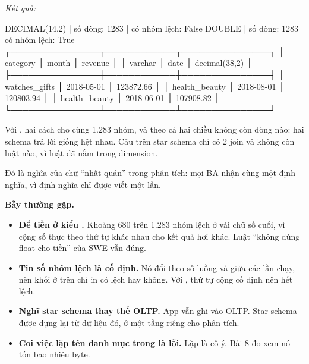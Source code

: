 \textit{Kết quả:}
\begin{codeblock}
DECIMAL(14,2) | số dòng: 1283 | có nhóm lệch: False
DOUBLE | số dòng: 1283 | có nhóm lệch: True
┌───────────────┬────────────┬───────────────┐
│   category    │   month    │    revenue    │
│    varchar    │    date    │ decimal(38,2) │
├───────────────┼────────────┼───────────────┤
│ watches_gifts │ 2018-05-01 │     123872.66 │
│ health_beauty │ 2018-08-01 │     120803.94 │
│ health_beauty │ 2018-06-01 │     107908.82 │
└───────────────┴────────────┴───────────────┘
\end{codeblock}

Với , hai cách cho cùng 1.283 nhóm, và  theo cả hai chiều không còn dòng nào: hai schema trả lời giống hệt nhau. Câu trên star schema chỉ có 2 join và không còn luật nào, vì luật đã nằm trong dimension.

Đó là nghĩa của chữ ``nhất quán'' trong phân tích: mọi BA nhận cùng một định nghĩa, vì định nghĩa chỉ được viết một lần.

\begin{luuy}
\textbf{Bẫy thường gặp.}
\begin{itemize}
  \item \textbf{Để tiền ở kiểu .} Khoảng 680 trên 1.283 nhóm lệch ở vài chữ số cuối, vì cộng số thực theo thứ tự khác nhau cho kết quả hơi khác. Luật ``không dùng float cho tiền'' của SWE vẫn đúng.
  \item \textbf{Tin số nhóm lệch là cố định.} Nó đổi theo số luồng và giữa các lần chạy, nên khối ở trên chỉ in có lệch hay không. Với , thứ tự cộng cố định nên hết lệch.
  \item \textbf{Nghĩ star schema thay thế OLTP.} App vẫn ghi vào OLTP. Star schema được dựng lại từ dữ liệu đó, ở một tầng riêng cho phân tích.
  \item \textbf{Coi việc lặp tên danh mục trong  là lỗi.} Lặp là cố ý. Bài 8 đo xem nó tốn bao nhiêu byte.
\end{itemize}
\end{luuy}


